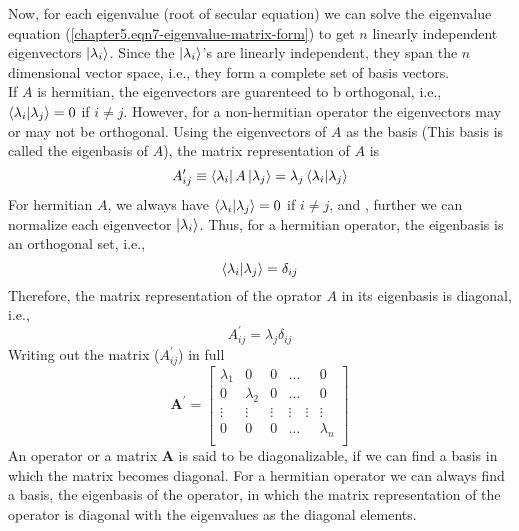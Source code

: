 	Now, for each eigenvalue (root of secular equation) we can solve the eigenvalue equation (\ref{chapter5.eqn7-eigenvalue-matrix-form}) to get $n$ linearly independent eigenvectors $\ket{\lambda_i}$. Since the $\ket{\lambda_i}$'s are linearly independent, they span the $n$ dimensional vector space, i.e., they form a complete set of basis vectors.\\
	If $A$ is hermitian, the eigenvectors are guarenteed to b orthogonal, i.e., $\braket{\lambda_i}{\lambda_j} = 0$ if $i\neq j$. However, for a non-hermitian operator the eigenvectors may or may not be orthogonal.
	Using the eigenvectors of $A$ as the basis (This basis is called the eigenbasis of $A$), the matrix representation of $A$ is
	\begin{equation}
		A_{ij}^\prime \equiv \bra{\lambda_i} A \ket{\lambda_j} = \lambda_j \braket{\lambda_i}{\lambda_j}
		\label{chapter5.eqn8-matrix-reps}
	\end{equation}
	For hermitian $A$, we always have $\braket{\lambda_i}{\lambda_j} = 0$ if $i \neq j$, and , further we can normalize each eigenvector $\ket{\lambda_i}$. Thus, for a hermitian operator, the eigenbasis is an orthogonal set, i.e., 
	\begin{equation}
		\braket{\lambda_i}{\lambda_j} = \delta_{ij}
		\label{chapter5.eqn9-eigenbasis}
	\end{equation}
	Therefore, the matrix representation of the oprator $A$ in its eigenbasis is diagonal, i.e.,
	\begin{equation}
		A_{ij}^\prime = \lambda_j\delta_{ij}
		\label{chapter5.eqn9-matrix-reps-diagonal}
	\end{equation}
	Writing out the matrix ($A_{ij}^\prime$) in full
	\begin{equation}
		\mathbf{A}^\prime = \left[
		\begin{matrix}
			\lambda_1 &	0	& 0	& \ldots	& 0 \\			
			0 &	\lambda_2	& 0	& \ldots	& 0 \\
			\vdots &	\vdots	& \vdots	& \vdots \quad \vdots	& \vdots \\	
			0 & 0	& 	 0 & \ldots	& \lambda_n  \\
		\end{matrix}
		\right]
	\end{equation}
	An operator or a matrix $\mathbf{A}$ is said to be diagonalizable, if we can find a basis in which the matrix becomes diagonal. For a hermitian operator we can always find a basis, the eigenbasis of the operator, in which the matrix representation of the operator is diagonal with the eigenvalues as the diagonal elements.\\
	
